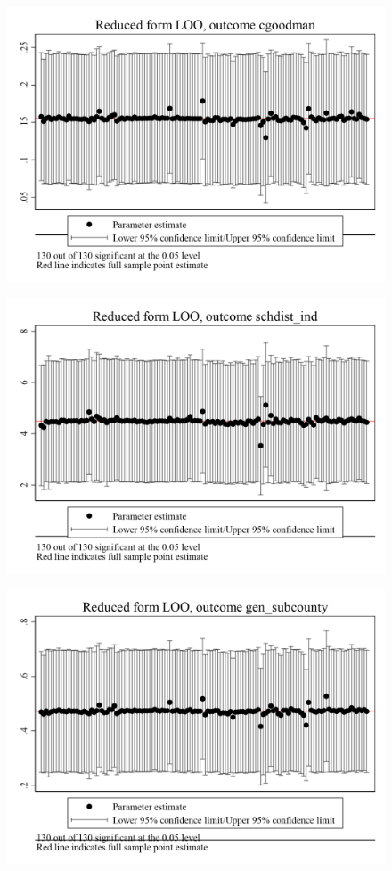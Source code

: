 \documentclass{article}
\begin{document}
\begin{figure}
	\centering
	\includegraphics[width=.8\textwidth]{figures/exogeneity_tests/loo_rf_cgoodman.png}
\end{figure}
\clearpage
\begin{figure}
	\centering
	\includegraphics[width=.8\textwidth]{figures/exogeneity_tests/loo_rf_schdist_ind.png}
\end{figure}
\clearpage
\begin{figure}
	\centering
	\includegraphics[width=.8\textwidth]{figures/exogeneity_tests/loo_rf_gen_subcounty.png}
\end{figure}
\end{document}
